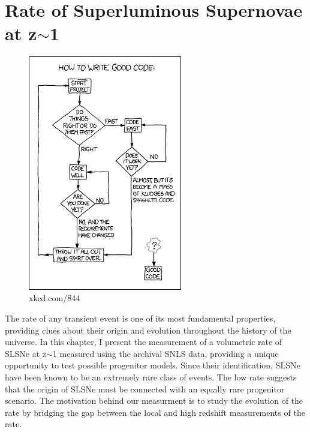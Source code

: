 \chapter{Rate of Superluminous Supernovae at z$\sim$1}
\label{Chapter4}

\begin{figure}[H]
  \centering
  \includegraphics[width=0.6\textwidth]{Figures/xkcd/chapter4.png}
  \caption*{xkcd.com/844}
\end{figure}

The rate of any transient event is one of its most fundamental properties, providing clues about their origin and evolution throughout the history of the universe. In this chapter, I present the measurement of a volumetric rate of SLSNe at z$\sim$1 measured using the archival SNLS data, providing a unique opportunity to test possible progenitor models. Since their identification, SLSNe have been known to be an extremely rare class of events. The low rate suggests that the origin of SLSNe must be connected with an equally rare progenitor scenario. The motivation behind our measurment is to study the evolution of the rate by bridging the gap between the local and high redshift measurements of the rate.

